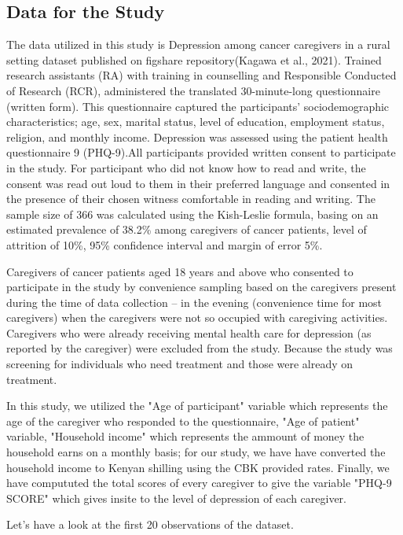 \documentclass{article}
\numberwithin{equation}{section}
\begin{document}
\subsection{Data for the Study}
The data utilized in this study is Depression among cancer caregivers in a rural setting dataset published on figshare repository(Kagawa et al., 2021). Trained research assistants (RA) with training in counselling and Responsible Conducted of Research (RCR), administered the translated 30-minute-long questionnaire (written form). This questionnaire captured the participants’ sociodemographic characteristics; age, sex, marital status, level of education, employment status, religion, and monthly income. Depression was assessed using the patient health questionnaire 9 (PHQ-9).All participants provided written consent to participate in the study. For participant who did not know how to read and write, the consent was read out loud to them in their preferred language and consented in the presence of their chosen witness comfortable in reading and writing.
The sample size of 366 was calculated using the Kish-Leslie formula, basing on an estimated prevalence of 38.2\% among caregivers of cancer patients, level of attrition of 10\%, 95\% confidence interval and margin of error 5\%.

\noindent Caregivers of cancer patients aged 18 years and above who consented to participate in the study by convenience sampling based on the caregivers present during the time of data collection – in the evening (convenience time for most caregivers) when the caregivers were not so occupied with caregiving activities. Caregivers who were already receiving mental health care for depression (as reported by the caregiver) were excluded from the study. Because the study was screening for individuals who need treatment and those were already on treatment.

\noindent In this study, we utilized the "Age of participant" variable which represents the age of the caregiver who responded to the questionnaire, "Age of patient" variable, "Household income" which represents the ammount of money the household earns on a monthly basis; for our study, we have have converted the household income to Kenyan shilling using the CBK provided rates. Finally, we have  compututed the total scores of every caregiver to give the variable "PHQ-9 SCORE" which gives insite to the level of depression of each caregiver.

\noindent Let's have a look at the first 20 observations of the dataset.
\end{document}
